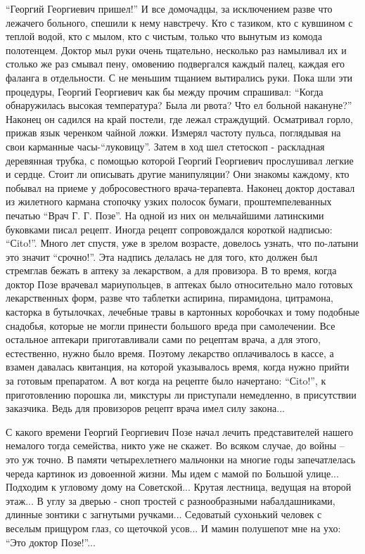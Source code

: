 \enquote{Георгий Георгиевич пришел!} И все домочадцы, за исключением разве что лежачего
больного, спешили к нему навстречу. Кто с тазиком, кто с кувшином с теплой
водой, кто с мылом, кто с чистым, только что вынутым из комода полотенцем.
Доктор мыл руки очень тщательно, несколько раз намыливал их и столько же раз
смывал пену, омовению подвергался каждый палец, каждая его фаланга в
отдельности. С не меньшим тщанием вытирались руки. Пока шли эти процедуры,
Георгий Георгиевич как бы между прочим спрашивал: \enquote{Когда  обнаружилась высокая
температура? Была ли рвота? Что ел больной накануне?} Наконец он садился на
край постели, где лежал страждущий. Осматривал горло, прижав язык черенком
чайной ложки. Измерял частоту пульса, поглядывая на свои карманные
часы-\enquote{луковицу}. Затем в ход шел стетоскоп - раскладная деревянная трубка, с
помощью которой  Георгий Георгиевич прослушивал легкие и сердце. Стоит ли
описывать другие манипуляции?  Они знакомы каждому, кто побывал на приеме у
добросовестного врача-терапевта. Наконец доктор доставал из жилетного кармана
стопочку узких полосок бумаги, проштемпелеванных печатью \enquote{Врач Г. Г. Позе}. На
одной из них он мельчайшими латинскими буковками писал рецепт. Иногда рецепт
сопровождался короткой надписью: \enquote{Сito!}. Много лет спустя, уже в зрелом
возрасте, довелось узнать, что по-латыни это значит \enquote{срочно!}. Эта надпись
делалась не для того, кто должен был стремглав бежать в аптеку за лекарством, а
для провизора. В то время, когда доктор Позе врачевал мариупольцев, в аптеках
было относительно мало готовых лекарственных форм, разве что таблетки аспирина,
пирамидона, цитрамона, касторка в бутылочках, лечебные травы в картонных
коробочках и тому подобные снадобья, которые не могли принести большого вреда
при самолечении. Все остальное аптекари приготавливали сами по рецептам врача,
а для этого, естественно, нужно было время. Поэтому лекарство оплачивалось в
кассе, а взамен давалась квитанция, на которой указывалось время, когда нужно
прийти за готовым препаратом. А вот когда на рецепте было начертано: \enquote{Сito!}, к
приготовлению порошка ли, микстуры ли приступали немедленно,  в присутствии
заказчика. Ведь для провизоров рецепт врача имел силу закона...  


С какого времени Георгий Георгиевич Позе начал лечить представителей нашего
немалого тогда семейства, никто уже не скажет. Во всяком  случае, до войны –
это уж точно. В памяти четырехлетнего мальчонки  на многие годы запечатлелась
череда картинок из довоенной жизни. Мы идем с мамой по Большой улице... Подходим
к угловому дому на Советской... Крутая лестница, ведущая на второй этаж...  В углу
за дверью - сноп тростей с разнообразными набалдашниками, длинные зонтики с
загнутыми ручками... Седоватый сухонький человек с веселым прищуром глаз, со
щеточкой усов... И мамин полушепот мне на ухо: \enquote{Это доктор Позе!}...

